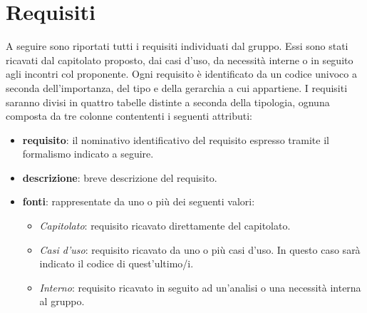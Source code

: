%


\section{Requisiti}

A seguire sono riportati tutti i requisiti individuati dal gruppo. Essi sono stati ricavati dal capitolato proposto, dai casi d'uso, da necessità interne o in seguito agli incontri col proponente. Ogni requisito è identificato da un codice univoco a seconda dell'importanza, del tipo e della gerarchia a cui appartiene.
I requisiti saranno divisi in quattro tabelle distinte a seconda della tipologia, ognuna composta da tre colonne contententi i seguenti attributi:
\begin{itemize}
	\item \textbf{requisito}: il nominativo identificativo del requisito espresso tramite il formalismo indicato a seguire.
	\item \textbf{descrizione}: breve descrizione del requisito.
	\item \textbf{fonti}: rappresentate da uno o più dei seguenti valori:
	\begin{itemize}
		\item \emph{Capitolato}: requisito ricavato direttamente del capitolato.
		\item \emph{Casi d'uso}: requisito ricavato da uno o più casi d'uso. In questo caso sarà indicato il codice di quest'ultimo/i.
		\item \emph{Interno}: requisito ricavato in seguito ad un'analisi o una necessità interna al gruppo.
	\end{itemize}
\end{itemize}

